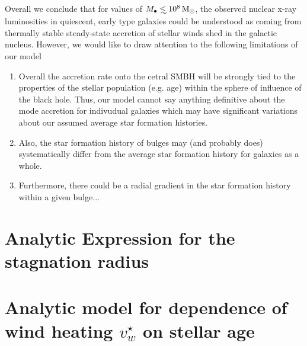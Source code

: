 \documentclass[usenatbib,fleqn]{mn2e}
\newcommand\lsim{\mathrel{\rlap{\lower4pt\hbox{\hskip1pt$\sim$}}
    \raise1pt\hbox{$<$}}}
\newcommand{\Mbh}[1][]{M_{\bullet#1}}
\newcommand{\vwO}{v_{w}}
\begin{document}
    Overall we conclude that for values of $\Mbh\lsim 10^{8} \Msun$,
    the observed nuclear x-ray luminosities in quiescent, early type
    galaxies could be understood as coming from thermally stable
    steady-state accretion of stellar winds shed in the galactic
    nucleus.  However, we would like to draw attention to the
    following limitations of our model

    \begin{enumerate}
    \item Overall the accretion rate onto the cetral SMBH will be strongly
    tied to the properties of the stellar population (e.g. age) within
    the sphere of influence of the black hole. Thus, our model cannot
    say anything definitive about the mode accretion for indivudual
    galaxies which may have significant variations about our assumed
    average star formation histories.
    \item Also, the star formation history of bulges may (and probably
      does) systematically differ from the average star formation
      history for galaxies as a whole.
    \item Furthermore, there could be a radial gradient in the star
      formation history within a given bulge... 
    \end{enumerate}
  

  


  \clearpage
  \appendix
  \section{Analytic Expression for the stagnation radius}
  \label{app:rs}
  


\section{Analytic model for dependence of wind heating $\vwO^{\star}$ on stellar age}
\label{app:windheat}


  \footnotesize{
    
    
  }
\end{document}

